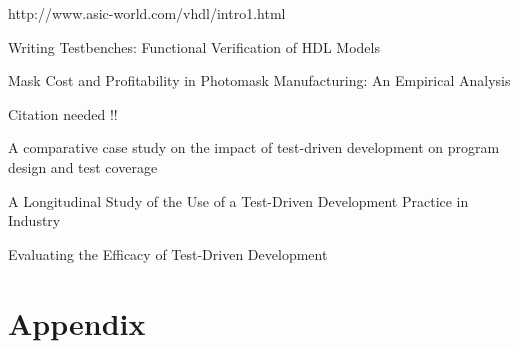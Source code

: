 \documentclass[11pt,british]{article}
\newcommand\blankpage{%
    \null
    \thispagestyle{empty}%
    \addtocounter{page}{-1}%
    \newpage}
\begin{document}
\pagebreak{}
\begin{thebibliography}{1}
http://www.asic-world.com/vhdl/intro1.html

Writing Testbenches: Functional Verification of HDL
Models

Mask Cost and Profitability in Photomask Manufacturing:
An Empirical Analysis

Citation needed !!

A comparative case study on the impact of test-driven
development on program design and test coverage

A Longitudinal Study of the Use of a Test-Driven Development
Practice in Industry

Evaluating the Efficacy of Test-Driven Development

\end{thebibliography}


\newpage{}
\part{Appendix}


\afterpage{\blankpage}
\end{document}

